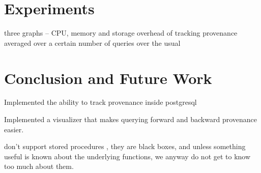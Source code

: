 \documentclass[11pt]{article}
\begin{document}
\section{Experiments}

three graphs -- CPU, memory and storage overhead of tracking provenance averaged over a certain number of queries over the usual

\section{Conclusion and Future Work}

Implemented the ability to track provenance inside postgresql

Implemented a visualizer that makes querying forward and backward provenance easier.

don't support stored procedures , they are black boxes, and unless something useful is known about the underlying functions, we anyway do not get to know too much about them.



\end{document}
